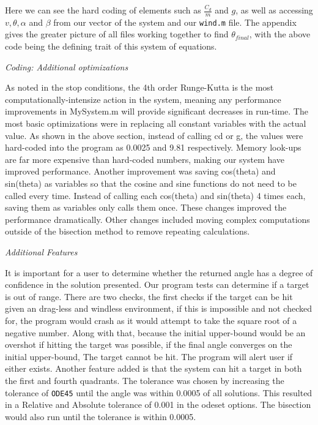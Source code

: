 \documentclass[12pt]{article}
\begin{document}
\begin{enumerate}
{Here we can see the hard coding of elements such as $\frac{C_d}{m}$ and $g$, as well as accessing $v,\theta, \alpha$ and $\beta$ from our vector of the system and our \texttt{wind.m} file.  The appendix gives the greater picture of all files working together to find $\theta_{final}$, with the above code being the defining trait of this system of equations.
}

\large{\item\textit{Coding: Additional optimizations}}

\normalsize{As noted in the stop conditions, the 4th order Runge-Kutta is the most computationally-intensize action in the system, meaning any performance improvements in MySystem.m will provide significant decreases in run-time. The most basic optimizations were in replacing all constant variables with the actual value. As shown in the above section, instead of calling cd or g, the values were hard-coded into the program as 0.0025 and 9.81 respectively. Memory look-ups are far more expensive than hard-coded numbers, making our system have improved performance. Another improvement was saving cos(theta) and sin(theta) as variables so that the cosine and sine functions do not need to be called every time. Instead of calling each cos(theta) and sin(theta) 4 times each, saving them as variables only calls them once. These changes improved the performance dramatically. Other changes included moving complex computations outside of the bisection method to remove repeating calculations.}

\large{\item\textit{Additional Features}}

\normalsize{It is important for a user to determine whether the returned angle has a degree of confidence in the solution presented. Our program tests can determine if a target is out of range. There are two checks, the first checks if the target can be hit given an drag-less and windless environment, if this is impossible and not checked for, the program would crash as it would attempt to take the square root of a negative number. Along with that, because the initial upper-bound would be an overshot if hitting the target was possible, if the final angle converges on the initial upper-bound, The target cannot be hit. The program will alert user if either exists. Another feature added is that the system can hit a target in both the first and fourth quadrants. The tolerance was chosen by increasing the tolerance of \texttt{ODE45} until the angle was within 0.0005 of all solutions. This resulted in a Relative and Absolute tolerance of 0.001 in the odeset options. The bisection would also run until the tolerance is within 0.0005.}


\end{enumerate}
\end{document}
